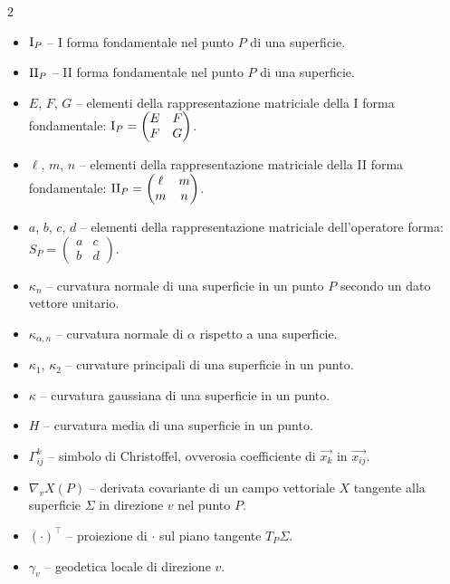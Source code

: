 \begin{multicols*}{2}
\begin{itemize}
            \item $\mathrm{I}_P$ -- I forma fondamentale nel punto $P$ di una superficie.
            \item $\mathrm{II}_P$ -- II forma fondamentale nel punto $P$ di una superficie.
            \item $E$, $F$, $G$ -- elementi della rappresentazione matriciale della I forma fondamentale: $\mathrm{I}_P = \begin{pmatrix}
                              E & F \\ F & G
                        \end{pmatrix}$.
            \item $\ell$, $m$, $n$ -- elementi della rappresentazione matriciale della II forma fondamentale: $\mathrm{II}_P = \begin{pmatrix}
                              \ell & m \\ m & n
                        \end{pmatrix}$.
            \item $a$, $b$, $c$, $d$ -- elementi della rappresentazione matriciale dell'operatore forma: $S_P = \begin{pmatrix}
                              a & c \\ b & d
                        \end{pmatrix}$.
            \item $\kappa_n$ -- curvatura normale di una superficie in un punto $P$ secondo un dato vettore unitario.
            \item $\kappa_{\alpha, n}$ -- curvatura normale di $\alpha$ rispetto a una superficie.
            \item $\kappa_1$, $\kappa_2$ -- curvature principali di una superficie in un punto.
            \item $\kappa$ -- curvatura gaussiana di una superficie in un punto.
            \item $H$ -- curvatura media di una superficie in un punto.
            \item $\Gamma_{ij}^k$ -- simbolo di Christoffel, ovverosia coefficiente di $\vec{x_k}$ in $\vec{x_{ij}}$.
            \item $\nabla_v X(P)$ -- derivata covariante di un campo vettoriale $X$ tangente alla superficie $\Sigma$ in direzione $v$ nel punto $P$.
            \item $(\cdot)^\top$ -- proiezione di $\cdot$ sul piano tangente $T_P \Sigma$.
            \item $\gamma_v$ -- geodetica locale di direzione $v$.

\end{itemize}
\end{multicols*}

